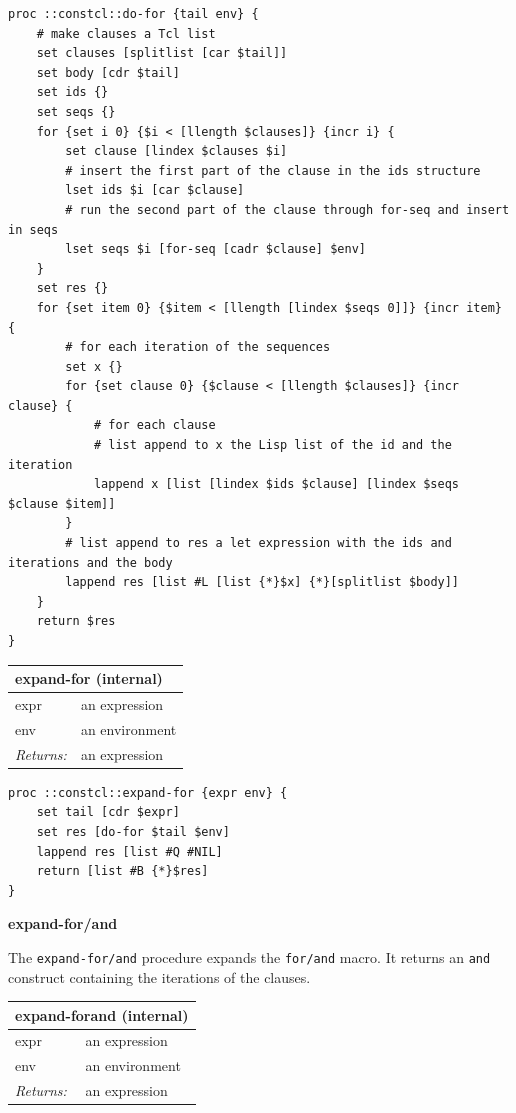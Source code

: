 \documentclass[twoside,9pt]{report}
\begin{document}
\noindent\makebox[\linewidth]{\rule{\linewidth}{0.4pt}}
\begin{lstlisting}
proc ::constcl::do-for {tail env} {
    # make clauses a Tcl list
    set clauses [splitlist [car $tail]]
    set body [cdr $tail]
    set ids {}
    set seqs {}
    for {set i 0} {$i < [llength $clauses]} {incr i} {
        set clause [lindex $clauses $i]
        # insert the first part of the clause in the ids structure
        lset ids $i [car $clause]
        # run the second part of the clause through for-seq and insert in seqs
        lset seqs $i [for-seq [cadr $clause] $env]
    }
    set res {}
    for {set item 0} {$item < [llength [lindex $seqs 0]]} {incr item} {
        # for each iteration of the sequences
        set x {}
        for {set clause 0} {$clause < [llength $clauses]} {incr clause} {
            # for each clause
            # list append to x the Lisp list of the id and the iteration
            lappend x [list [lindex $ids $clause] [lindex $seqs $clause $item]]
        }
        # list append to res a let expression with the ids and iterations and the body
        lappend res [list #L [list {*}$x] {*}[splitlist $body]]
    }
    return $res
}
\end{lstlisting}
\noindent\makebox[\linewidth]{\rule{\linewidth}{0.4pt}}
\begin{tabular}{ |l l| }
\hline
\multicolumn{2}{|l|}{expand-for (internal)} \\
\hline
expr & an expression \\
env & an environment \\
\textit{Returns:} & an expression \\
\hline
\end{tabular}

\noindent\makebox[\linewidth]{\rule{\linewidth}{0.4pt}}
\begin{lstlisting}
proc ::constcl::expand-for {expr env} {
    set tail [cdr $expr]
    set res [do-for $tail $env]
    lappend res [list #Q #NIL]
    return [list #B {*}$res]
}
\end{lstlisting}
\noindent\makebox[\linewidth]{\rule{\linewidth}{0.4pt}}

\textbf{expand-for/and}


The \texttt{expand-for/and} procedure expands the \texttt{for/and} macro. It returns an \texttt{and} construct containing the iterations of the clauses.

\begin{tabular}{ |l l| }
\hline
\multicolumn{2}{|l|}{expand-forand (internal)} \\
\hline
expr & an expression \\
env & an environment \\
\textit{Returns:} & an expression \\
\hline
\end{tabular}
\end{document}
